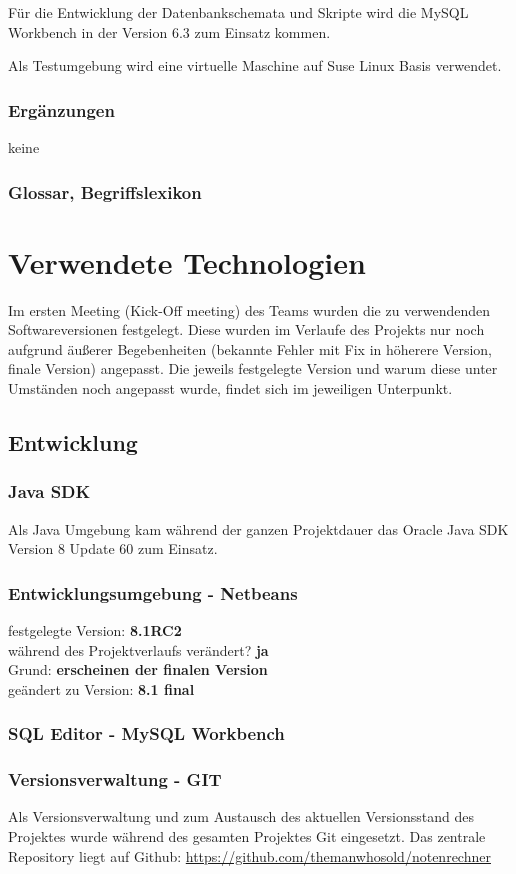 \documentclass[12pt,a4paper,parskip]{scrreprt}
\begin{document}
Für die Entwicklung der Datenbankschemata und Skripte wird die MySQL Workbench in der Version 6.3 zum Einsatz kommen.

Als Testumgebung wird eine virtuelle Maschine auf Suse Linux Basis verwendet.
\subsection{Ergänzungen}
keine
\subsection{Glossar, Begriffslexikon}
\chapter{Verwendete Technologien}
Im ersten Meeting (Kick-Off meeting) des Teams wurden die zu verwendenden Softwareversionen festgelegt. Diese wurden im Verlaufe des Projekts nur noch aufgrund äußerer Begebenheiten (bekannte Fehler mit Fix in höherere Version, finale Version) angepasst. Die jeweils festgelegte Version und warum diese unter Umständen noch angepasst wurde, findet sich im jeweiligen Unterpunkt.
\section{Entwicklung}
\subsection{Java SDK}
Als Java Umgebung kam während der ganzen Projektdauer das Oracle Java SDK Version 8 Update 60 zum Einsatz.
\subsection{Entwicklungsumgebung - Netbeans}
festgelegte Version: \textbf{8.1RC2}\\
während des Projektverlaufs verändert? \textbf{ja}\\
Grund: \textbf{erscheinen der finalen Version} \\
geändert zu Version: \textbf{8.1 final}\\

\subsection{SQL Editor - MySQL Workbench}
\subsection{Versionsverwaltung - GIT}
Als Versionsverwaltung und zum Austausch des aktuellen Versionsstand des Projektes wurde während des gesamten Projektes Git eingesetzt. Das zentrale Repository liegt auf Github:
\url{https://github.com/themanwhosold/notenrechner}
\end{document}
